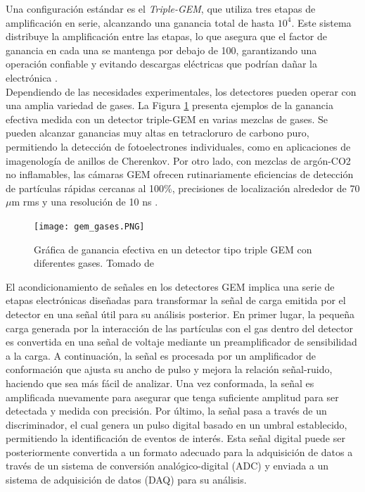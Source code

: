 \documentclass{article}
\begin{document}
\noindent Una configuración estándar es el \textit{Triple-GEM}, que utiliza tres etapas de amplificación en serie, alcanzando una ganancia total de hasta $10^4$. Este sistema distribuye la amplificación entre las etapas, lo que asegura que el factor de ganancia en cada una se mantenga por debajo de 100, garantizando una operación confiable y evitando descargas eléctricas que podrían dañar la electrónica \cite{bencivenni2002triple}.\\

\noindent Dependiendo de las necesidades experimentales, los detectores pueden operar con una amplia variedad de gases. La Figura \ref{fig:gem_gases} presenta ejemplos de la ganancia efectiva medida con un detector triple-GEM en varias mezclas de gases. Se pueden alcanzar ganancias muy altas en tetracloruro de carbono puro, permitiendo la detección de fotoelectrones individuales, como en aplicaciones de imagenología de anillos de Cherenkov. Por otro lado, con mezclas de argón-CO2 no inflamables, las cámaras GEM ofrecen rutinariamente eficiencias de detección de partículas rápidas cercanas al 100\%, precisiones de localización alrededor de 70 $\mu$m rms y una resolución de 10 ns \cite{ketzer2004performance}.

\begin{figure}[H]
    \centering
    \texttt{[image: gem\_gases.PNG]}
    \caption{Gráfica de ganancia efectiva en un detector tipo triple GEM con diferentes gases. Tomado de \cite{breskin2002gem}}
    \label{fig:gem_gases}
\end{figure}

\noindent El acondicionamiento de señales en los detectores GEM implica una serie de etapas electrónicas diseñadas para transformar la señal de carga emitida por el detector en una señal útil para su análisis posterior. En primer lugar, la pequeña carga generada por la interacción de las partículas con el gas dentro del detector es convertida en una señal de voltaje mediante un preamplificador de sensibilidad a la carga. A continuación, la señal es procesada por un amplificador de conformación que ajusta su ancho de pulso y mejora la relación señal-ruido, haciendo que sea más fácil de analizar. Una vez conformada, la señal es amplificada nuevamente para asegurar que tenga suficiente amplitud para ser detectada y medida con precisión. Por último, la señal pasa a través de un discriminador, el cual genera un pulso digital basado en un umbral establecido, permitiendo la identificación de eventos de interés. Esta señal digital puede ser posteriormente convertida a un formato adecuado para la adquisición de datos a través de un sistema de conversión analógico-digital (ADC) y enviada a un sistema de adquisición de datos (DAQ) para su análisis.
\newpage
\end{document}

